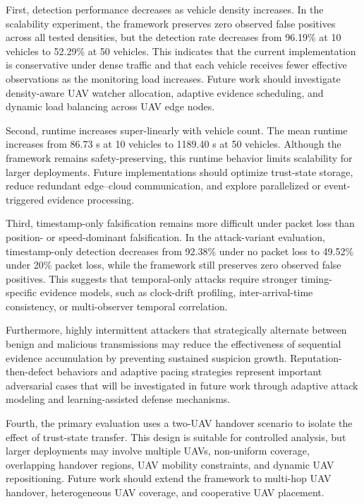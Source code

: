 \documentclass[journal]{IEEEtran}
\begin{document}
First, detection performance decreases as vehicle density increases. In the scalability experiment, the framework preserves zero observed false positives across all tested densities, but the detection rate decreases from 96.19\% at 10 vehicles to 52.29\% at 50 vehicles. This indicates that the current implementation is conservative under dense traffic and that each vehicle receives fewer effective observations as the monitoring load increases. Future work should investigate density-aware UAV watcher allocation, adaptive evidence scheduling, and dynamic load balancing across UAV edge nodes.

Second, runtime increases super-linearly with vehicle count. The mean runtime increases from 86.73 s at 10 vehicles to 1189.40 s at 50 vehicles. Although the framework remains safety-preserving, this runtime behavior limits scalability for larger deployments. Future implementations should optimize trust-state storage, reduce redundant edge--cloud communication, and explore parallelized or event-triggered evidence processing.

Third, timestamp-only falsification remains more difficult under packet loss than position- or speed-dominant falsification. In the attack-variant evaluation, timestamp-only detection decreases from 92.38\% under no packet loss to 49.52\% under 20\% packet loss, while the framework still preserves zero observed false positives. This suggests that temporal-only attacks require stronger timing-specific evidence models, such as clock-drift profiling, inter-arrival-time consistency, or multi-observer temporal correlation.

Furthermore, highly intermittent attackers that strategically alternate
between benign and malicious transmissions may reduce the effectiveness of
sequential evidence accumulation by preventing sustained suspicion growth.
Reputation-then-defect behaviors and adaptive pacing strategies represent
important adversarial cases that will be investigated in future work through
adaptive attack modeling and learning-assisted defense mechanisms.

Fourth, the primary evaluation uses a two-UAV handover scenario to isolate the effect of trust-state transfer. This design is suitable for controlled analysis, but larger deployments may involve multiple UAVs, non-uniform coverage, overlapping handover regions, UAV mobility constraints, and dynamic UAV repositioning. Future work should extend the framework to multi-hop UAV handover, heterogeneous UAV coverage, and cooperative UAV placement.
\end{document}
